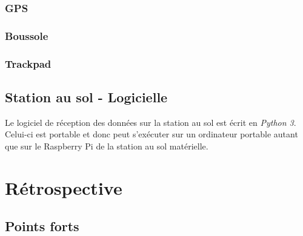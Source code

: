 \subsubsection{GPS}



\subsubsection{Boussole}



\subsubsection{Trackpad}



\subsection{Station au sol - Logicielle}

Le logiciel de réception des données sur la station au sol est écrit en
\textit{Python 3}. Celui-ci est portable et donc peut s'exécuter sur un
ordinateur portable autant que sur le Raspberry Pi de la station au sol
matérielle.

\section{Rétrospective}

\subsection{Points forts}

